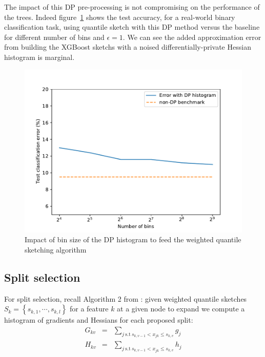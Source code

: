\documentclass{article}
\theoremstyle{definition}
\begin{document}
The impact of this DP pre-processing is not compromising on the performance of the trees. Indeed figure~\ref{sketchAccuracy2} shows the test accuracy,
for a real-world binary classification task, using quantile sketch with this DP method versus the baseline for different number of bins and $\epsilon = 1$.
We can see the added approximation error from building the XGBoost sketchs with a noised differentially-private Hessian histogram is marginal. 

\begin{figure}[h]
\centering 
\includegraphics[scale=0.7]{figs/plot_accuracy_bins.pdf}
\caption{Impact of bin size of the DP histogram to feed the weighted quantile sketching algorithm}
\label{sketchAccuracy2}
\end{figure}

\subsection{Split selection}

For split selection, recall Algorithm 2 from \cite{chen2016xgboost}: given weighted quantile sketches $S_k = \left\{ s_{k,1}, \cdots, s_{k,l} \right\} $ for a feature $k$ at a given node to expand we compute a histogram of gradients and Hessians for each proposed split: 
\begin{eqnarray*} 
G_{kv} &=& \sum_{j\ \text{s.t}\ s_{k,v-1} < x_{jk} \leq s_{k,v} } g_j \\
H_{kv} &=& \sum_{j\ \text{s.t}\ s_{k,v-1} < x_{jk} \leq s_{k,v} } h_j 
\end{eqnarray*}
\end{document}
